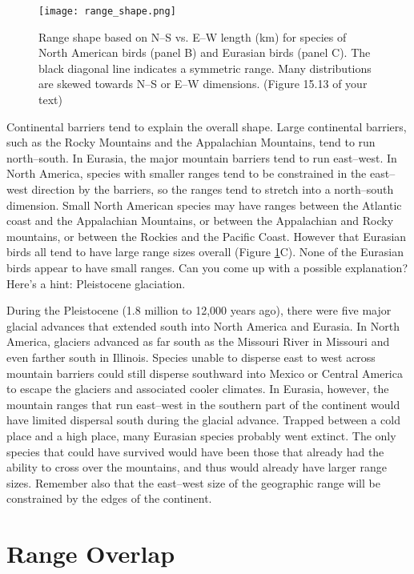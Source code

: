 \documentclass[12pt, oneside]{article}   	%
\begin{document}
\begin{figure}
	\centering
		\texttt{[image: range\_shape.png]}  
		\caption{Range shape based on N--S vs. E--W length (km) for species of North American birds (panel B) and Eurasian birds (panel C). The black diagonal line indicates a symmetric range. Many distributions are skewed towards N--S or E--W dimensions. (Figure 15.13 of your text) \label{range shape}}
\end{figure}

Continental barriers tend to explain the overall shape.  Large continental barriers, such as the Rocky Mountains and the Appalachian Mountains, tend to run north--south.  In Eurasia, the major mountain barriers tend to run east--west. In North America, species with smaller ranges tend to be constrained in the east--west direction by the barriers, so the ranges tend to stretch into a north--south dimension.  Small North American species may have ranges between the Atlantic coast and the Appalachian Mountains, or between the Appalachian and Rocky mountains, or between the Rockies and the Pacific Coast.  However that Eurasian birds all tend to have large range sizes overall (Figure \ref{range shape}C).  None of the Eurasian birds appear to have small ranges. Can you come up with a possible explanation?  Here's a hint: Pleistocene glaciation.

During the Pleistocene (1.8 million to 12,000 years ago), there were five major glacial advances that extended south into North America and Eurasia. In North America, glaciers advanced as far south as the Missouri River in Missouri and even farther south in Illinois.  Species unable to disperse east to west across mountain barriers could still disperse southward into Mexico or Central America to escape the glaciers and associated cooler climates.  In Eurasia, however, the mountain ranges that run east--west in the southern part of the continent would have limited dispersal south during the glacial advance.  Trapped between a cold place and a high place, many Eurasian species probably went extinct.  The only species that could have survived would have been those that already had the ability to cross over the mountains, and thus would already have larger range sizes. Remember also that the east--west size of the geographic range will be constrained by the edges of the continent.

\section{Range Overlap}
\end{document}
